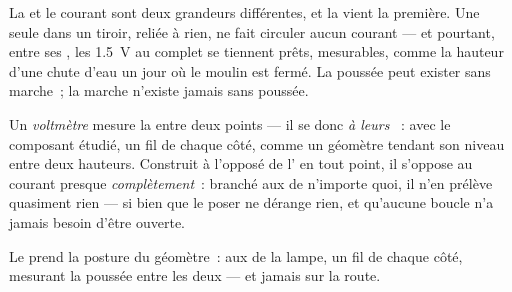 \begin{proposition}\label{prop:g8:voltage-voltmeter:nocurrent}
La  et le courant sont deux grandeurs différentes, et la
 vient la première. Une  seule dans un tiroir, reliée à
rien, ne fait circuler aucun courant --- et pourtant, entre ses
, les \qty{1.5}{V} au complet se tiennent prêts, mesurables,
comme la hauteur d'une chute d'eau un jour où le moulin est fermé. La
poussée peut exister sans marche~; la marche n'existe jamais sans
poussée.
\end{proposition}

\begin{definition}[Voltmètre]\label{def:g8:voltage-voltmeter:voltmeter}
Un \emph{voltmètre} mesure la  entre deux
points --- il se  donc \emph{à leurs }~: \emph{} avec le composant étudié, un fil de chaque côté, comme un
géomètre tendant son niveau entre deux hauteurs. Construit à l'opposé
de l' en tout point, il s'oppose au courant presque
\emph{complètement}~: branché aux  de n'importe quoi, il n'en
prélève quasiment rien --- si bien que le poser ne dérange rien, et
qu'aucune boucle n'a jamais besoin d'être ouverte.
\end{definition}

\begin{omfigure}

{\small Le  prend la posture du géomètre~: aux  de la
lampe, un fil de chaque côté, mesurant la poussée entre les deux ---
et jamais sur la route.}
\end{omfigure}

